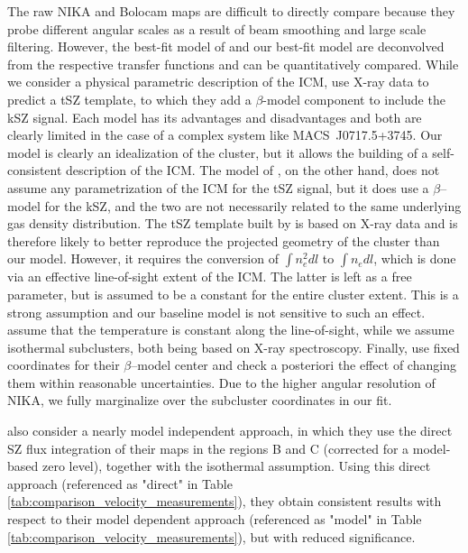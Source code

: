 \documentclass[twocolumn,traditabstract]{aa}
\begin{document}
The raw NIKA and Bolocam maps are difficult to directly compare because they probe different angular scales as a result of beam smoothing and large scale filtering. However, the best-fit model of \cite{Sayers2013} and our best-fit model are deconvolved from the respective transfer functions and can be quantitatively compared. While we consider a physical parametric description of the ICM, \cite{Sayers2013} use X-ray data to predict a tSZ template, to which they add a $\beta$-model component to include the kSZ signal. Each model has its advantages and disadvantages and both are clearly limited in the case of a complex system like \mbox{MACS~J0717.5+3745}. Our model is clearly an idealization of the cluster, but it allows the building of a self-consistent description of the ICM. The model of \cite{Sayers2013}, on the other hand, does not assume any parametrization of the ICM for the tSZ signal, but it does use a $\beta$--model for the kSZ, and the two are not necessarily related to the same underlying gas density distribution. The tSZ template built by \cite{Sayers2013} is based on X-ray data and is therefore likely to better reproduce the projected geometry of the cluster than our model. However, it requires the conversion of $\int n_e^2 dl$ to $\int n_e dl$, which is done via an effective line-of-sight extent of the ICM. The latter is left as a free parameter, but is assumed to be a constant for the entire cluster extent. This is a strong assumption and our baseline model is not sensitive to such an effect. \cite{Sayers2013} assume that the temperature is constant along the line-of-sight, while we assume isothermal subclusters, both being based on X-ray spectroscopy. Finally, \cite{Sayers2013} use fixed coordinates for their $\beta$--model center and check a posteriori the effect of changing them within reasonable uncertainties. Due to the higher angular resolution of NIKA, we fully marginalize over the subcluster coordinates in our fit.

\cite{Sayers2013} also consider a nearly model independent approach, in which they use the direct SZ flux integration of their maps in the regions B and C (corrected for a model-based zero level), together with the isothermal assumption. Using this direct approach (referenced as "direct" in Table \ref{tab:comparison_velocity_measurements}), they obtain consistent results with respect to their model dependent approach (referenced as "model" in Table \ref{tab:comparison_velocity_measurements}), but with reduced significance.
\end{document}
